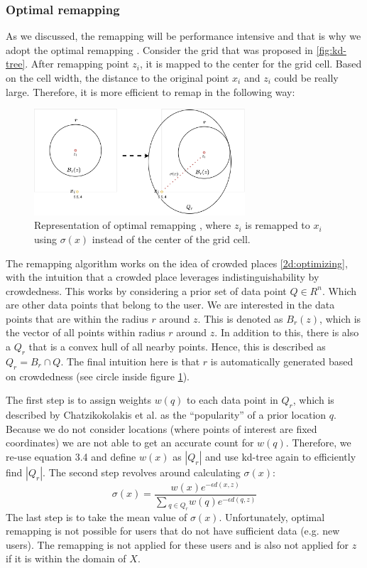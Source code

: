 \subsubsection{Optimal remapping}
As we discussed, the remapping will be performance intensive and that is why we adopt the optimal remapping \citep{chatzikokolakis_efficient_2017}.
Consider the grid that was proposed in \ref{fig:kd-tree}.
After remapping point $z_i$, it is mapped to the center for the grid cell.
Based on the cell width, the distance to the original point $x_i$ and $ z_i$ could be really large.
Therefore, it is more efficient to remap in the following way:
\begin{figure}[H]
  \includegraphics[width=0.7\textwidth]{TheorethicalFramework/ND-Laplace/Images/optimal-remapping.png}
  \caption{Representation of optimal remapping \citep{chatzikokolakis_efficient_2017}, where $z_i$ is remapped to $x_i$ using $\sigma(x)$ instead of the center of the grid cell.}
  \label{fig:optimal-remapping}
\end{figure}
The remapping algorithm works on the idea of crowded places \ref{2d:optimizing}, with the intuition that a crowded place leverages indistinguishability by crowdedness.
This works by considering a prior set of data point $Q \in R^n$.
Which are other data points that belong to the user.
We are interested in the data points that are within the radius $r$ around $z$.
This is denoted as $B_r(z)$, which is the vector of all points within radius $r$ around $z$.
In addition to this, there is also a $Q_r$ that is a convex hull of all nearby points.
Hence, this is described as $Q_r = B_r \cap Q$.
The final intuition here is that $r$ is automatically generated based on crowdedness (see circle inside figure \ref{fig:optimal-remapping}).

The first step is to assign weights $w(q) $ to each data point in $Q_r$, which is described by Chatzikokolakis et al. as the “popularity” of a prior location $q$.
Because we do not consider locations (where points of interest are fixed coordinates) we are not able to get an accurate count for $w(q)$.
Therefore, we re-use equation 3.4 and define $ w(x)$ as $ |Q_r|$ and use kd-tree again to efficiently find $|Q_r|$.
The second step revolves around calculating $\sigma(x)$:
\begin{equation}
  \sigma(x) = \frac{w(x)e^{-\epsilon d(x, z)}}{\sum{_{q\in Q_r} w(q)e^{-\epsilon d(q, z)}}}
  \label{eq:optimal-remapping-formula-1}
\end{equation}
The last step is to take the mean value of $\sigma(x)$.
Unfortunately, optimal remapping is not possible for users that do not have sufficient data (e.g. new users).
The remapping is not applied for these users and is also not applied for $z$ if it is within the domain of $X$.

